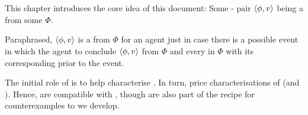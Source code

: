 \chapter{}
\label{cha:fcs}

\nocite{Ryle:1946tu}

\begin{note}
  This chapter introduces the core idea of this document:
  Some - pair \(\langle \phi, v \rangle\) being a \emph{\fc{}} from some  \(\Phi\).

  Paraphrased, \(\langle \phi, v \rangle\) is a \fc{} from \(\Phi\) for an agent just in case there is a possible event in which the agent to conclude \(\langle \phi, v \rangle\) from \(\Phi\) and \evals{} every \prop{} in \(\Phi\) with its corresponding \val{} prior to the event.
\end{note}

\begin{note}
  The initial role of  is to help characterise \ros{}.
  In turn, price characterisations of \qWhy{} (and \qHow{}).
  Hence,  are compatible with \issueInclusion{}, though are also part of the recipe for counterexamples to \issueInclusion{} we develop.
\end{note}

